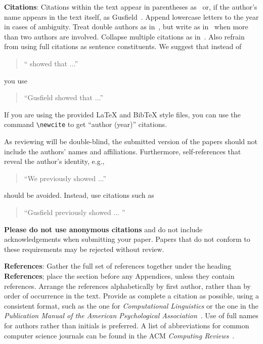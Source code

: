\documentclass[11pt]{article}
\begin{document}
{\bf Citations}: Citations within the text appear
in parentheses as~\cite{Gusfield:97} or, if the author's name appears in
the text itself, as Gusfield~. 
Append lowercase letters to the year in cases of ambiguity.  
Treat double authors as in~\cite{Aho:72}, but write as
 in~\cite{Chandra:81} when more than two authors are involved. Collapse multiple citations as
in~\cite{Gusfield:97,Aho:72}. Also refrain from using full citations as sentence constituents. We
suggest that instead of
\begin{quote}
  ``\cite{Gusfield:97} showed that ...''
\end{quote}
you use
\begin{quote}
``Gusfield    showed that ...''
\end{quote}

If you are using the provided \LaTeX{} and Bib\TeX{} style files, you
can use the command \verb|\newcite| to get ``author (year)'' citations.

As reviewing will be double-blind, the submitted version of the papers should not include the
authors' names and affiliations. Furthermore, self-references that
reveal the author's identity, e.g.,
\begin{quote}
``We previously showed \cite{Gusfield:97} ...''  
\end{quote}
should be avoided. Instead, use citations such as 
\begin{quote}
``Gusfield 
previously showed ... ''
\end{quote}

\textbf{Please do not  use anonymous citations} and  do not include acknowledgements 
when submitting your paper. Papers that do not conform
to these requirements may be rejected without review. 

\textbf{References}: Gather the full set of references together under
the heading {\bf References}; place the section before any Appendices,
unless they contain references. Arrange the references alphabetically
by first author, rather than by order of occurrence in the text.
Provide as complete a citation as possible, using a consistent format,
such as the one for {\em Computational Linguistics\/} or the one in the 
{\em Publication Manual of the American 
Psychological Association\/}~\cite{APA:83}.  Use of full names for
authors rather than initials is preferred.  A list of abbreviations
for common computer science journals can be found in the ACM 
{\em Computing Reviews\/}~\cite{ACM:83}.
\end{document}
